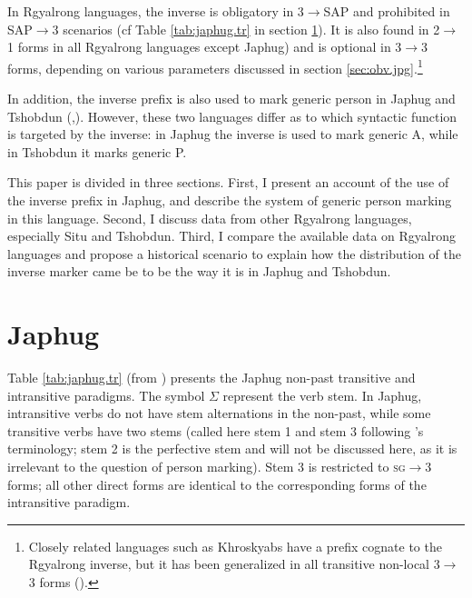 \documentclass[oldfontcommands,oneside,a4paper,11pt]{article}
\newcommand{\ro}{$\Sigma$}
\begin{document}
In Rgyalrong languages, the inverse is obligatory in 3$\rightarrow$SAP and prohibited in SAP$\rightarrow$3 scenarios (cf Table \ref{tab:japhug.tr} in section \ref{sec:japhug}). It is also found in  2$\rightarrow$1 forms in all Rgyalrong languages except Japhug) and is optional in 3$\rightarrow$3 forms, depending on various parameters discussed  in section \ref{sec:obv.jpg}.\footnote{Closely related languages such as Khroskyabs have a prefix cognate to the Rgyalrong inverse, but it has been generalized in all transitive non-local 3$\rightarrow$3 forms (\citealt{lai13affixale}).}

In addition, the inverse prefix is also used to mark generic person in Japhug and Tshobdun  (\citealt{jacques12demotion},\citealt{sun14generic}). However, these two languages differ as to which syntactic function is targeted by the inverse: in Japhug the inverse is used to mark generic A, while in Tshobdun it marks generic P. 

  This paper is divided in three sections. First, I present an account of the use of the inverse prefix in Japhug, and describe the system of generic person marking in this language. Second, I  discuss data from other Rgyalrong languages, especially Situ and Tshobdun. Third, I compare the available data on Rgyalrong languages and propose   a historical scenario to explain how the distribution of the inverse marker came be to be the way it is in Japhug and Tshobdun.
 
 
\section{Japhug} \label{sec:japhug}
Table \ref{tab:japhug.tr} (from  \citealt{jacques10inverse}) presents the Japhug non-past transitive and intransitive paradigms. The symbol \ro{} represent the verb stem. In Japhug, intransitive verbs do not have stem alternations in the non-past, while some transitive verbs have two stems (called here stem 1 and stem 3 following \citealt{jackson00sidaba}'s terminology; stem 2 is the perfective stem and will not be discussed here, as it is irrelevant to the question of person marking). Stem 3 is restricted to \textsc{sg}$\rightarrow$3 forms; all other direct forms are identical to the corresponding forms of the intransitive paradigm.
\end{document}
